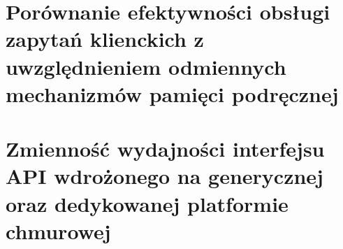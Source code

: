 \section{Porównanie efektywności obsługi zapytań klienckich z uwzględnieniem odmiennych mechanizmów pamięci podręcznej}


\section{Zmienność wydajności interfejsu API wdrożonego na generycznej oraz dedykowanej platformie chmurowej}


